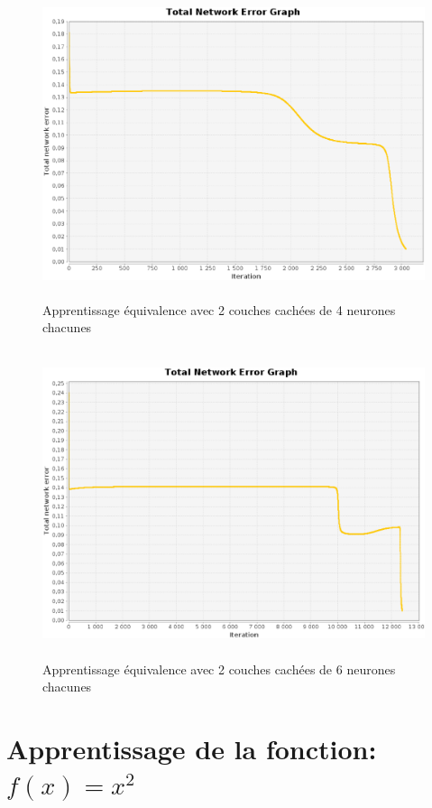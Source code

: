 \documentclass[twoside,openright,a4paper,11pt,french]{article}
\begin{document}
\begin{figure}[ht]
\centering
\includegraphics[width=12cm,height=9cm]{./pics/eq/multi_4_4_def.eps}
\caption{Apprentissage équivalence avec 2 couches cachées de 4 neurones chacunes}
\label{fig:eqmult2cc4}
\end{figure}

\begin{figure}[ht]
\centering
\includegraphics[width=12cm,height=9cm]{./pics/eq/multi_6_6_def.eps}
\caption{Apprentissage équivalence avec 2 couches cachées de 6 neurones chacunes}
\label{fig:eqmult2cc6}
\end{figure}


\clearpage
\section{Apprentissage de la fonction: $f(x) = x^2$}
\end{document}
